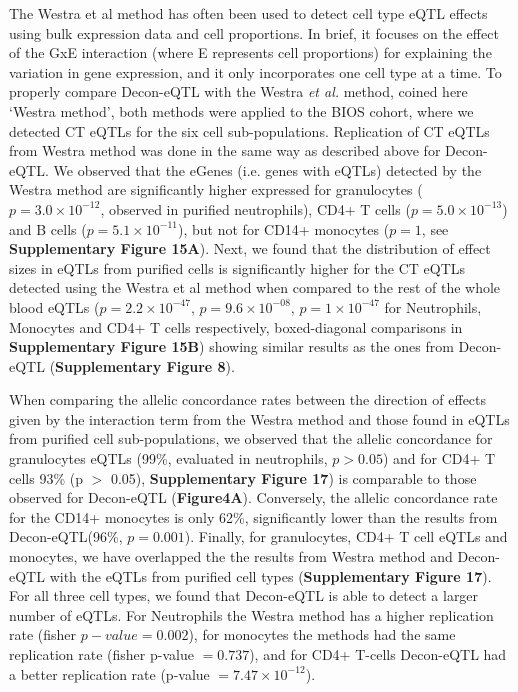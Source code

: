 The Westra et al method has often been used to detect cell type eQTL effects using bulk expression data and cell proportions\cite{davenportDiscoveringVivoCytokineeQTL2018,wilsonMappingTumorSpecificExpression2019,geeleherCancerExpressionQuantitative2018,glastonburyCellTypeHeterogeneityAdipose2019}. In brief, it focuses on the effect of the GxE interaction (where E represents cell proportions) for explaining the variation in gene expression, and it only incorporates one cell type at a time. To properly compare Decon-eQTL with the Westra \emph{et al.} method\cite{westraCellSpecificEQTL2015}, coined here ‘Westra method’, both methods were applied to the BIOS cohort, where we detected CT eQTLs for the six cell sub-populations. Replication of CT eQTLs from Westra method was done in the same way as described above for Decon-eQTL. We observed that the eGenes (i.e. genes with eQTLs) detected by the Westra method are significantly higher expressed for granulocytes ($p = 3.0 \times 10^{-12}$, observed in purified neutrophils), CD4+ T cells ($p = 5.0 \times 10^{-13}$) and B cells ($p = 5.1 \times 10^{-11}$), but not for CD14+ monocytes ($p = 1$, see \textbf{Supplementary Figure 15A}). Next, we found that the distribution of effect sizes in eQTLs from purified cells is significantly higher for the CT eQTLs detected using the Westra et al method when compared to the rest of the whole blood eQTLs ($p = 2.2 \times 10^{-47}$, $p = 9.6 \times 10^{-08}$, $p = 1 \times 10^{-47}$ for Neutrophils, Monocytes and CD4+ T cells respectively, boxed-diagonal comparisons in \textbf{Supplementary Figure 15B}) showing similar results as the ones from Decon-eQTL (\textbf{Supplementary Figure 8}).

When comparing the allelic concordance rates between the direction of effects given by the interaction term from the Westra method and those found in eQTLs from purified cell sub-populations, we observed that the allelic concordance for granulocytes eQTLs (99\%, evaluated in neutrophils, $p > 0.05$) and for CD4+ T cells 93\% (p $>$ 0.05), \textbf{Supplementary Figure 17}) is comparable to those observed for Decon-eQTL (\textbf{Figure4A}). Conversely, the allelic concordance rate for the CD14+ monocytes is only 62\%, significantly lower than the results from Decon-eQTL(96\%, $p = 0.001$). Finally, for granulocytes, CD4+ T cell eQTLs and monocytes, we have overlapped the the results from Westra method and Decon-eQTL with the eQTLs from purified cell types\cite{chenGeneticDriversEpigenetic2016} (\textbf{Supplementary Figure 17}). For all three cell types, we found that Decon-eQTL is able to detect a larger number of eQTLs. For Neutrophils the Westra method has a higher replication rate (fisher $p-value = 0.002$), for monocytes the methods had the same replication rate (fisher p-value $= 0.737$), and for CD4+ T-cells Decon-eQTL had a better replication rate (p-value $= 7.47 \times 10^{-12}$). 

